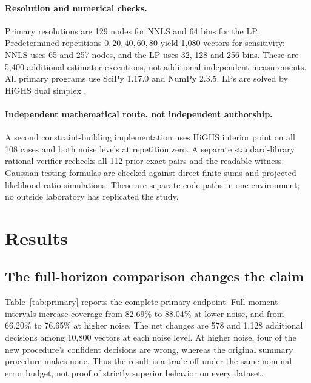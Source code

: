 \documentclass[11pt]{article}
\theoremstyle{remark}\newtheorem{remark}[proposition]{Remark}
\begin{document}
\paragraph{Resolution and numerical checks.}
Primary resolutions are 129 nodes for NNLS and 64 bins for the LP. Predetermined repetitions $0,20,40,60,80$ yield 1,080 vectors for sensitivity: NNLS uses 65 and 257 nodes, and the LP uses 32, 128 and 256 bins. These are 5,400 additional estimator executions, not additional independent measurements. All primary programs use SciPy 1.17.0 and NumPy 2.3.5. LPs are solved by HiGHS dual simplex \citep{scipy_highs}.

\paragraph{Independent mathematical route, not independent authorship.}
A second constraint-building implementation uses HiGHS interior point on all 108 cases and both noise levels at repetition zero. A separate standard-library rational verifier rechecks all 112 prior exact pairs and the readable witness. Gaussian testing formulas are checked against direct finite sums and projected likelihood-ratio simulations. These are separate code paths in one environment; no outside laboratory has replicated the study.

\section{Results}\label{sec:results}
\subsection{The full-horizon comparison changes the claim}
Table~\ref{tab:primary} reports the complete primary endpoint. Full-moment intervals increase coverage from 82.69\% to 88.04\% at lower noise, and from 66.20\% to 76.65\% at higher noise. The net changes are 578 and 1,128 additional decisions among 10,800 vectors at each noise level. At higher noise, four of the new procedure's confident decisions are wrong, whereas the original summary procedure makes none. Thus the result is a trade-off under the same nominal error budget, not proof of strictly superior behavior on every dataset.
\end{document}

